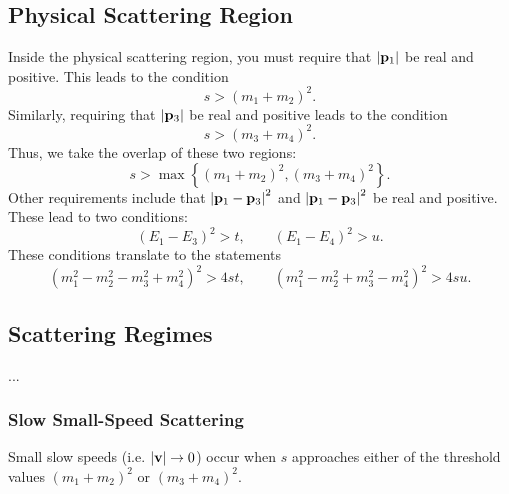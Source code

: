 \subsection{Physical Scattering Region}
Inside the physical scattering region, you must require that $\left\lvert \mathbf{p}_{1} \right\rvert$ be real and positive. This leads to the condition
\begin{equation}
	s > (m_{1} + m_{2})^{2}.
\end{equation}
Similarly, requiring that $\left\lvert \mathbf{p}_{3} \right\rvert$ be real and positive leads to the condition
\begin{equation}
	s > (m_{3} + m_{4})^{2}.
\end{equation}
Thus, we take the overlap of these two regions:
\begin{equation}
	s > \operatorname{max}{\left\lbrace (m_{1} + m_{2})^{2}, (m_{3} + m_{4})^{2} \right\rbrace}.
\end{equation}
Other requirements include that $\left\lvert  \mathbf{p}_{1} - \mathbf{p}_{3}  \right\rvert^{2}$ and $\left\lvert  \mathbf{p}_{1} - \mathbf{p}_{3}  \right\rvert^{2}$ be real and positive. These lead to two conditions:
\begin{equation}
	\left(E_{1} - E_{3} \right)^{2} > t, \qquad \left(E_{1} - E_{4} \right)^{2} > u.
\end{equation}
These conditions translate to the statements
\begin{equation}
	\left(m_{1}^{2} - m_{2}^{2} - m_{3}^{2} + m_{4}^{2} \right)^{2} > 4st, \qquad \left(m_{1}^{2} - m_{2}^{2} + m_{3}^{2} - m_{4}^{2} \right)^{2} > 4su.
\end{equation}
\subsection{Scattering Regimes}
...
\subsubsection{Slow Small-Speed Scattering}
Small slow speeds (i.e. $\left\lvert \mathbf{v} \right\rvert \rightarrow 0$) occur when $s$ approaches either of the threshold values $\left(m_{1} + m_{2}\right)^{2}$ or $\left(m_{3} + m_{4}\right)^{2}$.
